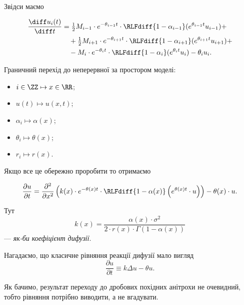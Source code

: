 Звідси маємо 
\begin{th_equation}
    \nothing
    \begin{equation}
        \begin{aligned}
            \frac{\diff u_i(t)}{\diff t}
            &= \tfrac{1}{2} M_{i - 1} \cdot e^{-\theta_{i - 1} t} \cdot \RLFdiff{1 - \alpha_{i - 1}} (e^{\theta_{i - 1} t} u_{i - 1}) + \\
            &\quad + \tfrac{1}{2} M_{i + 1} \cdot e^{-\theta_{i + 1} t} \cdot \RLFdiff{1 - \alpha_{i + 1}} (e^{\theta_{i + 1} t} u_{i + 1}) + \\
            &\quad - M_i \cdot e^{-\theta_i t} \cdot \RLFdiff{1 - \alpha_i}(e^{\theta_i t} u_i) - \theta_i u_i.
        \end{aligned}
    \end{equation}
\end{th_equation}

Граничний перехід до неперервної за простором моделі:
\begin{itemize}
    \item $i \in \ZZ \mapsto x \in \RR$;
    \item $u(t) \mapsto u(x, t)$;
    \item $\alpha_i \mapsto \alpha(x)$;
    \item $\theta_i \mapsto \theta(x)$;
    \item $r_i \mapsto r(x)$.
\end{itemize}

Якщо все це обережно проробити то отримаємо
\begin{th_equation}
    \nothing
    \begin{equation}
        \label{eq:starstar}
        \frac{\partial u}{\partial t} = \frac{\partial^2}{\partial x^2} \left( k(x) \cdot e^{-\theta(x) t} \cdot \RLFdiff{1 - \alpha(x)}\left( e^{\theta(x) t} \cdot u \right) \right) - \theta(x) \cdot u.
    \end{equation}
    
    Тут 
    \begin{equation}
        k(x) = \frac{\alpha(x) \cdot \sigma^2}{2 \cdot r(x) \cdot \Gamma(1 - \alpha(x))}
    \end{equation}
    --- \textit{як-би коефіцієнт дифузії}.
\end{th_equation}

\begin{remark}
    Нагадаємо, що класичне рівняння реакції дифузії мало вигляд
    \begin{equation}
        \frac{\partial u}{\partial t} \equiv k \Delta u - \theta u.
    \end{equation}
    
    Як бачимо, результат переходу до дробових похідних анітрохи не очевидний, тобто рівняння потрібно виводити, а не вгадувати.
\end{remark}

